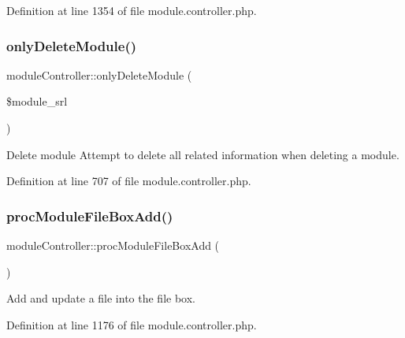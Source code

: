Definition at line 1354 of file module.\+controller.\+php.

\hypertarget{classmoduleController_ae34115eaf3d3b4d7621592f7cbfb9c7c}{}\label{classmoduleController_ae34115eaf3d3b4d7621592f7cbfb9c7c} 
\subsubsection{\texorpdfstring{only\+Delete\+Module()}{onlyDeleteModule()}}
{\footnotesize\ttfamily module\+Controller\+::only\+Delete\+Module (\begin{DoxyParamCaption}\item[{}]{\$module\+\_\+srl }\end{DoxyParamCaption})}

Delete module Attempt to delete all related information when deleting a module. 

Definition at line 707 of file module.\+controller.\+php.

\hypertarget{classmoduleController_a456022e1fca3a204b9b2b828b501fefb}{}\label{classmoduleController_a456022e1fca3a204b9b2b828b501fefb} 
\subsubsection{\texorpdfstring{proc\+Module\+File\+Box\+Add()}{procModuleFileBoxAdd()}}
{\footnotesize\ttfamily module\+Controller\+::proc\+Module\+File\+Box\+Add (\begin{DoxyParamCaption}{ }\end{DoxyParamCaption})}



Add and update a file into the file box. 



Definition at line 1176 of file module.\+controller.\+php.

\hypertarget{classmoduleController_a2b4e5ffa008e6a0a00bfe9844f475b0d}{}\label{classmoduleController_a2b4e5ffa008e6a0a00bfe9844f475b0d} 
